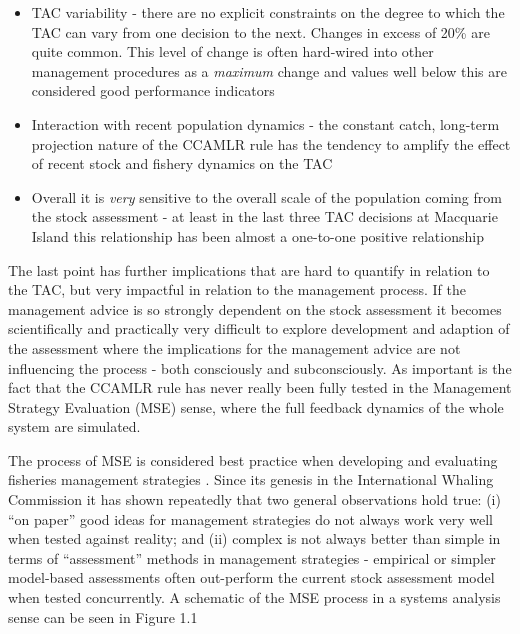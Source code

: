 \documentclass[12pt,a4paper,twoside,times,sky,standard]{csiroreport2017}
\begin{document}
\begin{itemize}
    \item TAC variability - there are no explicit constraints on the degree to which the TAC can vary from one decision to the next. Changes in excess of 20\% are quite common. This level of change is often hard-wired into other management procedures as a \emph{maximum} change and values well below this are considered good performance indicators
    \item Interaction with recent population dynamics - the constant catch, long-term projection nature of the CCAMLR rule has the tendency to amplify the effect of recent stock and fishery dynamics on the TAC
    \item Overall it is \emph{very} sensitive to the overall scale of the population coming from the stock assessment - at least in the last three TAC decisions at Macquarie Island this relationship has been almost a one-to-one positive relationship
\end{itemize}

The last point has further implications that are hard to quantify in relation to the TAC, but very impactful in relation to the management process. If the management advice is so strongly dependent on the stock assessment it becomes scientifically and practically very difficult to explore development and adaption of the assessment where the implications for the management advice are not influencing the process - both consciously and subconsciously. As important is the fact that the CCAMLR rule has never really been fully tested in the Management Strategy Evaluation (MSE) sense, where the full feedback dynamics of the whole system are simulated. 

The process of MSE is considered best practice when developing and evaluating fisheries management strategies \cite{mse}. Since its genesis in the International Whaling Commission \cite{iwc} it has shown repeatedly that two general observations hold true: (i) ``on paper'' good ideas for management strategies do not always work very well when tested against reality; and (ii) complex is not always better than simple in terms of ``assessment'' methods in management strategies - empirical or simpler model-based assessments often out-perform the current stock assessment model when tested concurrently. A schematic of the MSE process in a systems analysis sense can be seen in Figure 1.1
\end{document}

